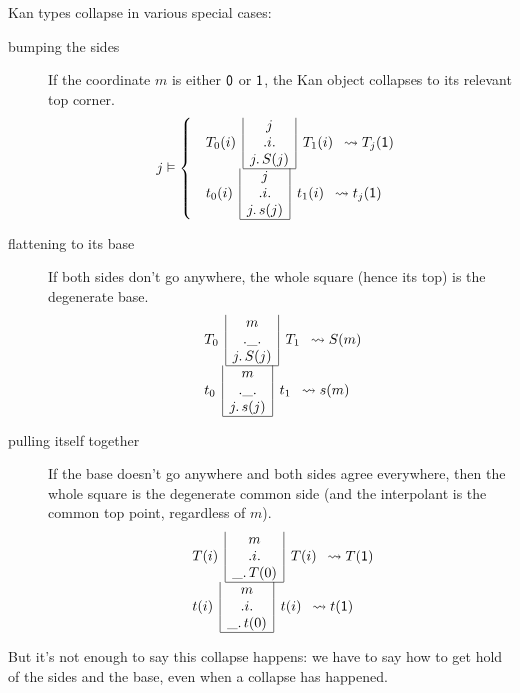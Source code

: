 \documentclass{article}
\newcommand{\ze}{\orange{\mathsf{0}}}
\newcommand{\un}{\orange{\mathsf{1}}}
\newcommand{\KAN}[6]{\blue{\begin{array}{r|c|l}
                        & \black{#6} & \\
                     \black{#2} & \black{.#1.} & \black{#3} \\
                        & \black{#4.\,#5} & \\
                      \cline{2-2}
                     \end{array}}}
\newcommand{\kan}[6]{\red{\begin{array}{r|c|l}
                        & \black{#6} & \\
                     \black{#2} & \black{.#1.} & \black{#3} \\
                        & \black{#4.\,#5} & \\
                      \cline{2-2}
                     \end{array}}}
\begin{document}
Kan types collapse in various special cases:
\begin{description}
\item[bumping the sides] If the coordinate $m$ is either $\ze$ or
  $\un$, the Kan object collapses to its relevant top corner.
\[
j\vDash\left\{\begin{array}{l}
\KAN i{T_0(i)}{T_1(i)}j{S(j)}j \leadsto T_j(\un) \\
\kan i{t_0(i)}{t_1(i)}j{s(j)}j \leadsto t_j(\un)
\end{array}\right.
\]
\item[flattening to its base] If both sides don't go anywhere, the
  whole square (hence its top) is the degenerate base.
\[
\begin{array}{l}
\KAN \_{T_0}{T_1}j{S(j)}m \leadsto S(m) \\
\kan \_{t_0}{t_1}j{s(j)}m \leadsto s(m)
\end{array}
\]
\item[pulling itself together] If the base doesn't go anywhere and
  both sides agree everywhere, then the whole square is the
  degenerate common side (and the interpolant is the common top
  point, regardless of $m$).
\[
\begin{array}{l}
\KAN i{T(i)}{T(i)}\_{T(0)}m \leadsto T(\un) \\
\kan i{t(i)}{t(i)}\_{t(0)}m \leadsto t(\un)
\end{array}
\]
\end{description}

But it's not enough to say this collapse happens: we have to say
how to get hold of the sides and the base, even when a collapse
has happened.
\end{document}
